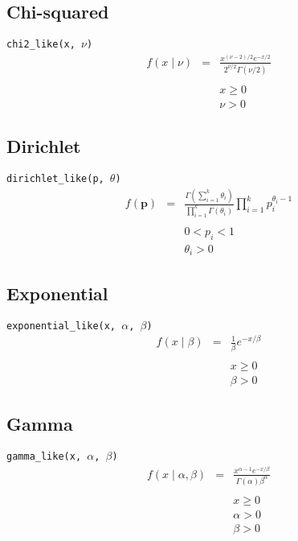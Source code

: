 \subsection*{Chi-squared}
\verb=chi2_like(x, =$\nu$\verb=)=
\begin{eqnarray*}
f(x \mid \nu) &=& \frac{x^{(\nu-2)/2}e^{-x/2}}{2^{\nu/2}\Gamma(\nu/2)} \\
\\
&& x \ge 0 \\
&& \nu > 0
\end{eqnarray*}

\subsection*{Dirichlet}
\verb=dirichlet_like(p, =$\theta$\verb=)=
\begin{eqnarray*}
f(\mathbf{p}) &=& \frac{\Gamma(\sum_{i=1}^k \theta_i)}{\prod_{i=1}^k \Gamma(\theta_i)} \prod_{i=1}^k p_i^{\theta_i - 1}\\
\\
&& 0 < p_i < 1 \\
&& \theta_i > 0
\end{eqnarray*}

\subsection*{Exponential}
\verb=exponential_like(x, =$\alpha$\verb=, =$\beta$\verb=)=
\begin{eqnarray*}
f(x \mid \beta) &=& \frac{1}{\beta}e^{-x/\beta} \\
\\
&& x \ge 0 \\
&& \beta > 0
\end{eqnarray*}

\subsection*{Gamma}
\verb=gamma_like(x, =$\alpha$\verb=, =$\beta$\verb=)=
\begin{eqnarray*}
f(x \mid \alpha, \beta) &=& \frac{x^{\alpha-1}e^{-x/\beta}}{\Gamma(\alpha) \beta^{\alpha}} \\
\\
&& x \ge 0 \\
&& \alpha > 0 \\
&& \beta > 0
\end{eqnarray*}

